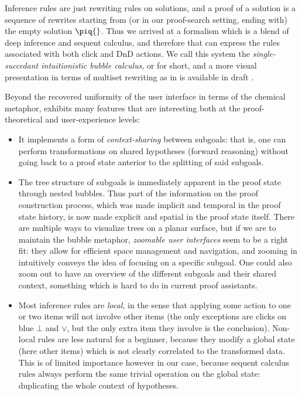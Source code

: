 Inference rules are just rewriting rules on solutions, and a proof of a solution
is a sequence of rewrites starting from (or in our proof-search setting, ending
with) the empty solution $\piq{}$. Thus we arrived at a formalism which is a
blend of deep inference and sequent calculus, and therefore that can express the
rules associated with both click and DnD actions. We call this system the
\emph{single-succedant intuitionistic bubble calculus}, or  for short,
and a more visual presentation in terms of multiset rewriting as in
\cite{berry_chemical_1989} is available in draft \cite{ICPM}.


Beyond the recovered uniformity of the user interface in terms of the chemical
metaphor,  exhibits many features that are interesting both at the
proof-theoretical and user-experience levels:
\begin{itemize}
  \item It implements a form of \emph{context-sharing} between subgoals: that
    is, one can perform transformations on shared hypotheses (forward reasoning)
    without going back to a proof state anterior to the splitting of said
    subgoals.
  \item The tree structure of subgoals is immediately apparent in the proof
    state through nested bubbles. Thus part of the information on the proof
    construction process, which was made implicit and temporal in the proof
    state history, is now made explicit and spatial in the proof state
    itself. There are
    multiple ways to visualize trees on a planar surface, but if we are to
    maintain the bubble metaphor, \emph{zoomable user interfaces} seem to be a
    right fit: they allow for efficient space management and navigation, and
    zooming in intuitively conveys the idea of focusing on a specific subgoal.
    One could also zoom out to have an overview of the different subgoals and
    their shared context, something which is hard to do in current proof
    assistants.
  \item Most inference rules are \emph{local}, in the sense that applying some
    action to one or two items will not involve other items (the only exceptions
    are clicks on blue $\bot$ and $\lor$, but the only extra item they involve
    is the conclusion). Non-local rules are less natural for a beginner, because
    they modify a global state (here other items) which is not clearly
    correlated to the transformed data. This is of limited importance however in
    our case, because sequent calculus rules always perform the same trivial
    operation on the global state: duplicating the whole context of hypotheses.
\end{itemize}

